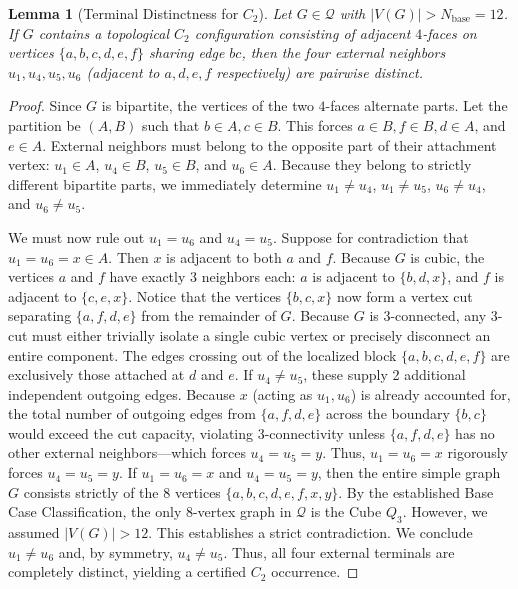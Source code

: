 \documentclass[12pt]{article}
\newtheorem{lemma}[theorem]{Lemma}
\begin{document}
\begin{lemma}[Terminal Distinctness for $C_2$]
\label{lem:app-c2-distinct}
Let $G \in \mathcal{Q}$ with $|V(G)| > N_{\mathrm{base}} = 12$. If $G$ contains a topological $C_2$ configuration consisting of adjacent $4$-faces on vertices $\{a,b,c,d,e,f\}$ sharing edge $bc$, then the four external neighbors $u_1, u_4, u_5, u_6$ (adjacent to $a, d, e, f$ respectively) are pairwise distinct.
\end{lemma}
\begin{proof}
Since $G$ is bipartite, the vertices of the two $4$-faces alternate parts. Let the partition be $(A, B)$ such that $b \in A, c \in B$. This forces $a \in B, f \in B, d \in A$, and $e \in A$. 
External neighbors must belong to the opposite part of their attachment vertex: $u_1 \in A$, $u_4 \in B$, $u_5 \in B$, and $u_6 \in A$. 
Because they belong to strictly different bipartite parts, we immediately determine $u_1 \neq u_4$, $u_1 \neq u_5$, $u_6 \neq u_4$, and $u_6 \neq u_5$.

We must now rule out $u_1 = u_6$ and $u_4 = u_5$.
Suppose for contradiction that $u_1 = u_6 = x \in A$. Then $x$ is adjacent to both $a$ and $f$. 
Because $G$ is cubic, the vertices $a$ and $f$ have exactly 3 neighbors each: $a$ is adjacent to $\{b, d, x\}$, and $f$ is adjacent to $\{c, e, x\}$.
Notice that the vertices $\{b, c, x\}$ now form a vertex cut separating $\{a, f, d, e\}$ from the remainder of $G$. Because $G$ is 3-connected, any 3-cut must either trivially isolate a single cubic vertex or precisely disconnect an entire component. The edges crossing out of the localized block $\{a,b,c,d,e,f\}$ are exclusively those attached at $d$ and $e$. 
If $u_4 \neq u_5$, these supply 2 additional independent outgoing edges. Because $x$ (acting as $u_1, u_6$) is already accounted for, the total number of outgoing edges from $\{a, f, d, e\}$ across the boundary $\{b, c\}$ would exceed the cut capacity, violating 3-connectivity unless $\{a, f, d, e\}$ has no other external neighbors—which forces $u_4 = u_5 = y$.
Thus, $u_1 = u_6 = x$ rigorously forces $u_4 = u_5 = y$. 
If $u_1 = u_6 = x$ and $u_4 = u_5 = y$, then the entire simple graph $G$ consists strictly of the 8 vertices $\{a,b,c,d,e,f,x,y\}$.
By the established Base Case Classification, the only 8-vertex graph in $\mathcal{Q}$ is the Cube $Q_3$. 
However, we assumed $|V(G)| > 12$. This establishes a strict contradiction. We conclude $u_1 \neq u_6$ and, by symmetry, $u_4 \neq u_5$. Thus, all four external terminals are completely distinct, yielding a certified $C_2$ occurrence.
\end{proof}
\end{document}
